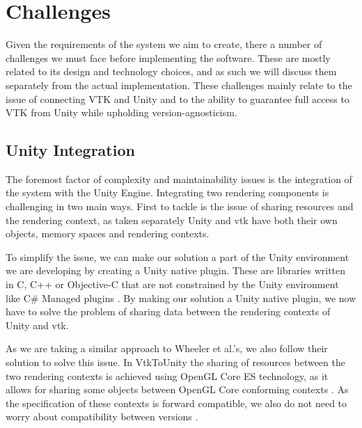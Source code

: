\section{Challenges}
\label{sec:rqrmsandclngs-challenges}

Given the requirements of the system we aim to create, there a number of challenges we must face before implementing the software. These are mostly related to its design and technology choices, and as such we will discuss them separately from the actual implementation. These challenges mainly relate to the issue of connecting VTK and Unity and to the ability to guarantee full access to VTK from Unity while upholding version-agnosticism.

\subsection{Unity Integration}

The foremost factor of complexity and maintainability issues is the integration of the system with the Unity Engine. Integrating two rendering components is challenging in two main ways. First to tackle is the issue of sharing resources and the rendering context, as taken separately Unity and \acrshort{vtk} have both their own objects, memory spaces and rendering contexts.

To simplify the issue, we can make our solution a part of the Unity environment we are developing by creating a Unity native plugin. These are libraries written in C, C++ or Objective-C that are not constrained by the Unity environment like C\# Managed plugins \cite{technologies_21AD}. By making our solution a Unity native plugin, we now have to solve the problem of sharing data between the rendering contexts of Unity and \acrshort{vtk}.

As we are taking a similar approach to Wheeler et al.'s, we also follow their solution to solve this issue. In VtkToUnity the sharing of resources between the two rendering contexts is achieved using OpenGL Core ES technology, as it allows for sharing some objects between OpenGL Core conforming contexts \cite{wheeler_virtual_2018}. As the specification of these contexts is forward compatible, we also do not need to worry about compatibility between versions \cite{khronos_opengl_2021}.

